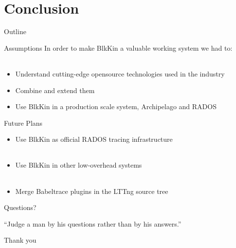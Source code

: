 \section{Conclusion}

\begin{frame}[t]{Outline}
\setcounter{tocdepth}{1}
\tableofcontents[currentsection]
\end{frame}

\begin{frame}{Assumptions}
In order to make BlkKin a valuable working system we had to:
\hfill \\
\hfill \\
\begin{itemize}
\item Understand cutting-edge opensource technologies used in the industry
\item Combine and extend them
\item Use BlkKin in a production scale system, Archipelago and RADOS
\end{itemize}
\end{frame}

\begin{frame}{Future Plans}
\begin{itemize}
\item Use BlkKin as official RADOS tracing infrastructure
\hfill \\
\hfill \\
\item Use BlkKin in other low-overhead systems
\hfill \\
\hfill \\
\item Merge Babeltrace plugins in the LTTng source tree
\end{itemize}
\end{frame}

\begin{frame}{Questions?}
\begin{exampleblock}{}
  {``Judge a man by his questions rather than by his answers.''}
  \vskip5mm
  \hspace*{}
\end{exampleblock}
\end{frame}

\begin{frame}
\begin{center}
{\Large Thank you }
\end{center}
\end{frame}

